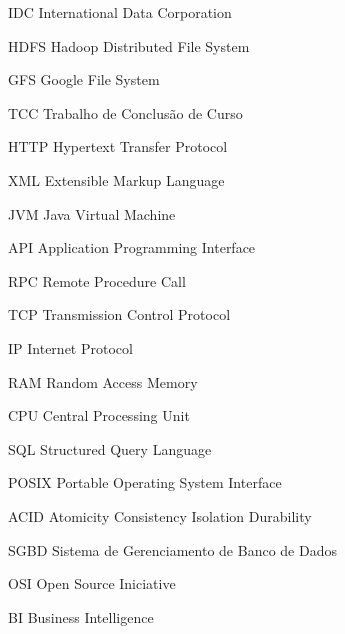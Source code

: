 \begin{siglas}

  \item[IDC] International Data Corporation
  \item[HDFS] Hadoop Distributed File System
  \item[GFS] Google File System
  \item[TCC] Trabalho de Conclusão de Curso
  \item[HTTP] Hypertext Transfer Protocol
  \item[XML] Extensible Markup Language
  \item[JVM] Java Virtual Machine
  \item[API] Application Programming Interface
  \item[RPC] Remote Procedure Call
  \item[TCP] Transmission Control Protocol
  \item[IP] Internet Protocol
  \item[RAM] Random Access Memory
  \item[CPU] Central Processing Unit
  \item[SQL] Structured Query Language
  \item[POSIX] Portable Operating System Interface
  \item[ACID] Atomicity Consistency Isolation Durability
  \item[SGBD] Sistema de Gerenciamento de Banco de Dados
  \item[OSI] Open Source Iniciative
  \item[BI] Business Intelligence

\end{siglas}
